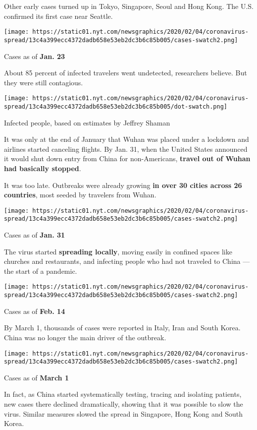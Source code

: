 Other early cases turned up in Tokyo, Singapore, Seoul and Hong Kong.
The U.S. confirmed its first case near Seattle.

\texttt{[image: https://static01.nyt.com/newsgraphics/2020/02/04/coronavirus-spread/13c4a399ecc4372dadb658e53eb2dc3b6c85b005/cases-swatch2.png]}

Cases as of \textbf{Jan. 23}

About 85 percent of infected travelers went undetected, researchers
believe. But they were still contagious.

\texttt{[image: https://static01.nyt.com/newsgraphics/2020/02/04/coronavirus-spread/13c4a399ecc4372dadb658e53eb2dc3b6c85b005/dot-swatch.png]}

Infected people, based on estimates by Jeffrey Shaman

It was only at the end of January that Wuhan was placed under a lockdown
and airlines started canceling flights. By Jan. 31, when the United
States announced it would shut down entry from China for non-Americans,
\textbf{travel out of Wuhan had basically stopped}.

It was too late. Outbreaks were already growing \textbf{in over 30
cities across 26 countries}, most seeded by travelers from Wuhan.

\texttt{[image: https://static01.nyt.com/newsgraphics/2020/02/04/coronavirus-spread/13c4a399ecc4372dadb658e53eb2dc3b6c85b005/cases-swatch2.png]}

Cases as of \textbf{Jan. 31}

The virus started \textbf{spreading locally}, moving easily in confined
spaces like churches and restaurants, and infecting people who had not
traveled to China --- the start of a pandemic.

\texttt{[image: https://static01.nyt.com/newsgraphics/2020/02/04/coronavirus-spread/13c4a399ecc4372dadb658e53eb2dc3b6c85b005/cases-swatch2.png]}

Cases as of \textbf{Feb. 14}

By March 1, thousands of cases were reported in Italy, Iran and South
Korea. China was no longer the main driver of the outbreak.

\texttt{[image: https://static01.nyt.com/newsgraphics/2020/02/04/coronavirus-spread/13c4a399ecc4372dadb658e53eb2dc3b6c85b005/cases-swatch2.png]}

Cases as of \textbf{March 1}

In fact, as China started systematically testing, tracing and isolating
patients, new cases there declined dramatically, showing that it was
possible to slow the virus. Similar measures slowed the spread in
Singapore, Hong Kong and South Korea.

